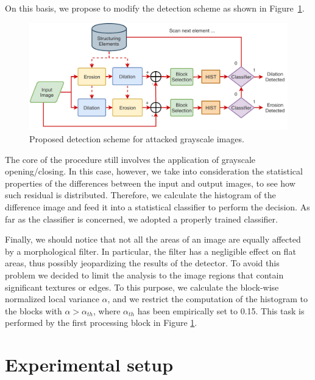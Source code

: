\documentclass[review]{elsarticle}
\begin{document}
On this basis, we propose to modify the detection scheme as shown in Figure~\ref{fig:scheme_improved}.
\begin{figure}[!ht]
	\centering
	\includegraphics[width=\linewidth]{diagram2}
	\caption{Proposed detection scheme for attacked grayscale images.} 
	\label{fig:scheme_improved}
\end{figure}
The core of the procedure still involves the application of grayscale opening/closing. In this case, however, we take into consideration the statistical properties of the differences between the input and output images, to see how such residual is distributed. Therefore, we calculate the histogram of the difference image and feed it into a statistical classifier to perform the decision. As far as the classifier is concerned, we adopted a properly trained classifier. %

Finally, we should notice that not all the areas of an image are equally affected by a morphological filter. In particular, the filter has a negligible effect on flat areas, thus possibly jeopardizing the results of the detector. To avoid this problem we decided to limit the analysis to the image regions that contain significant textures or edges. To this purpose, we calculate the block-wise normalized local variance $\alpha$, and we restrict the computation of the histogram to the blocks with $\alpha > \alpha_{th}$, where $\alpha_{th}$ has been empirically set to 0.15. This task is performed by the first processing block in Figure \ref{fig:scheme_improved}. 


\section{Experimental setup}
\label{sec:exp_setup}
\end{document}
